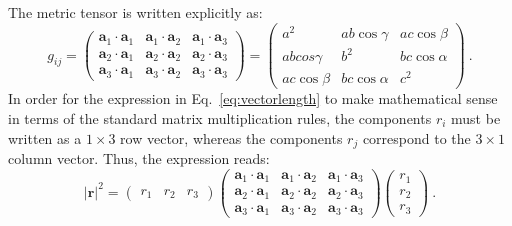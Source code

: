 The metric tensor is written explicitly as:
\[
	g_{ij} = \left(\begin{array}{ccc}
	\mathbf{a}_1\cdot\mathbf{a}_1 & \mathbf{a}_1\cdot\mathbf{a}_2 & \mathbf{a}_1\cdot\mathbf{a}_3 \\
	\mathbf{a}_2\cdot\mathbf{a}_1 & \mathbf{a}_2\cdot\mathbf{a}_2 & \mathbf{a}_2\cdot\mathbf{a}_3 \\
	\mathbf{a}_3\cdot\mathbf{a}_1 & \mathbf{a}_3\cdot\mathbf{a}_2 & \mathbf{a}_3\cdot\mathbf{a}_3 \end{array}\right)
	 = \left(\begin{array}{ccc}
	 a^2 & a b \cos\gamma & a c \cos\beta\\
	 a b cos\gamma & b^2 & b c \cos\alpha\\
	 a c \cos\beta & b c \cos\alpha & c^2 \end{array}\right)\ .
\]
In order for the expression in Eq.~\ref{eq:vectorlength} to make mathematical sense in terms of the standard matrix multiplication rules, the components $r_i$ must be written as a $1\times 3$ row vector, whereas the components $r_j$ correspond to the $3\times 1$ column vector.  Thus, the expression reads:
\[
	\vert\mathbf{r}\vert^2 = \left(\begin{array}{ccc}r_1 & r_2 & r_3\end{array}\right)
	 \left(\begin{array}{ccc}
	\mathbf{a}_1\cdot\mathbf{a}_1 & \mathbf{a}_1\cdot\mathbf{a}_2 & \mathbf{a}_1\cdot\mathbf{a}_3 \\
	\mathbf{a}_2\cdot\mathbf{a}_1 & \mathbf{a}_2\cdot\mathbf{a}_2 & \mathbf{a}_2\cdot\mathbf{a}_3 \\
	\mathbf{a}_3\cdot\mathbf{a}_1 & \mathbf{a}_3\cdot\mathbf{a}_2 & \mathbf{a}_3\cdot\mathbf{a}_3 \end{array}\right) 
	\left(\begin{array}{c}r_1\\
	r_2\\
	r_3\end{array}\right)\ .
\]

